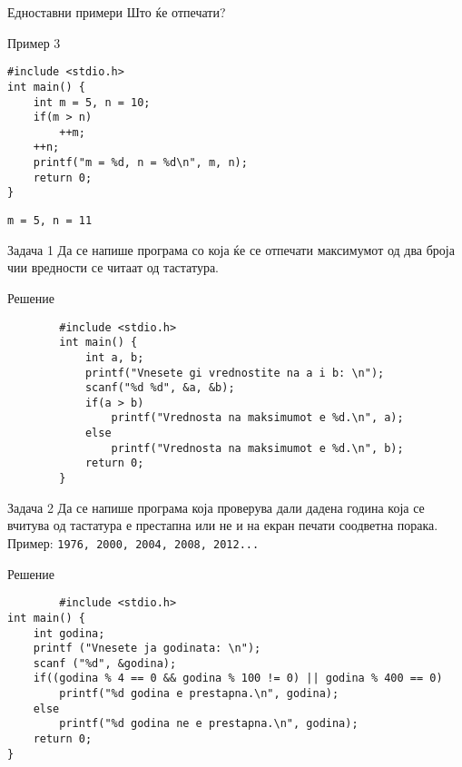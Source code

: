 \begin{frame}[fragile]{Едноставни примери}
Што ќе отпечати?
\begin{exampleblock}{Пример 3}
	\begin{lstlisting}
#include <stdio.h>
int main() {
    int m = 5, n = 10;
    if(m > n)
        ++m;
    ++n;
    printf("m = %d, n = %d\n", m, n);
    return 0;
} 
\end{lstlisting}
\end{exampleblock}
\pause
\vfill
\texttt{m = 5, n = 11}
\end{frame}


\begin{frame}[fragile]{Задача 1}
Да се напише програма со која ќе се отпечати максимумот од два броја чии вредности се читаат од тастатура.
\pause 
	\begin{exampleblock}{Решение}
		\begin{lstlisting}
		#include <stdio.h>
		int main() {
		    int a, b;
		    printf("Vnesete gi vrednostite na a i b: \n"); 
		    scanf("%d %d", &a, &b);
		    if(a > b)
		        printf("Vrednosta na maksimumot e %d.\n", a); 
		    else 
		        printf("Vrednosta na maksimumot e %d.\n", b); 
		    return 0; 
		}
		\end{lstlisting}
	\end{exampleblock}

\end{frame}

\begin{frame}[fragile]{Задача 2}
Да се напише програма која проверува дали дадена година која се вчитува од тастатура е престапна или не и на екран печати соодветна порака.\\
Пример: \texttt{1976, 2000, 2004, 2008, 2012...}
\pause
	\begin{exampleblock}{Решение}
		\begin{lstlisting}
		#include <stdio.h>
int main() { 
    int godina;
    printf ("Vnesete ja godinata: \n"); 
    scanf ("%d", &godina); 
    if((godina % 4 == 0 && godina % 100 != 0) || godina % 400 == 0) 
        printf("%d godina e prestapna.\n", godina); 
    else 
        printf("%d godina ne e prestapna.\n", godina); 
    return 0; 
}
		\end{lstlisting}
	\end{exampleblock}
\end{frame}


